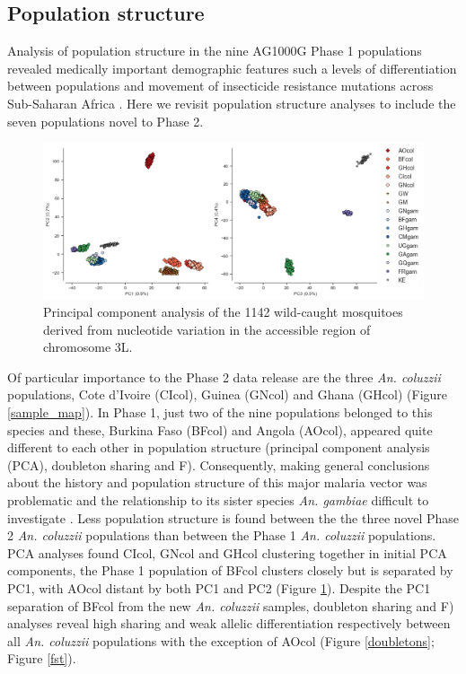 \documentclass[a4paper,11pt,abstracton,hidelinks]{scrartcl}
\begin{document}
\subsection*{Population structure}

Analysis of population structure in the nine AG1000G Phase 1 populations revealed medically important demographic features such a levels of differentiation between populations and movement of insecticide resistance mutations across Sub-Saharan Africa \cite{Ag1000gConsortium2017}.
% 
Here we revisit population structure analyses to include the seven populations novel to Phase 2.

\begin{figure}[H]
	\begin{center}
		\includegraphics*[width=6.3in]{artwork/pca_3L_main_text.jpeg}
	\end{center}
	\caption{Principal component analysis of the 1142 wild-caught mosquitoes derived from nucleotide variation in the accessible region of chromosome 3L.}
	\label{pca}
\end{figure}

%
Of particular importance to the Phase 2 data release are the three \textit{An. coluzzii} populations, Cote d'Ivoire (CIcol), Guinea (GNcol) and Ghana (GHcol) (Figure \ref{sample_map}). 
%
In Phase 1, just two of the nine populations belonged to this species and these, Burkina Faso (BFcol) and Angola (AOcol), appeared quite different to each other in population structure (principal component analysis (PCA), doubleton sharing and F).
%
Consequently, making general conclusions about the history and population structure of this major malaria vector was problematic and the relationship to its sister species \textit{An. gambiae} difficult to investigate \cite{Ag1000gConsortium2017}.
%
Less population structure is found between the the three novel Phase 2 \textit{An. coluzzii} populations than between the Phase 1 \textit{An. coluzzii} populations.
%
PCA analyses found CIcol, GNcol and GHcol clustering together in initial PCA components, the Phase 1 population of BFcol clusters closely but is separated by PC1, with AOcol distant by both PC1 and PC2 (Figure \ref{pca}).
%
Despite the PC1 separation of BFcol from the new \textit{An. coluzzii} samples, doubleton sharing and F) analyses reveal high sharing and weak allelic differentiation respectively between all \textit{An. coluzzii} populations with the exception of AOcol (Figure \ref{doubletons}; Figure \ref{fst}).
\end{document}
